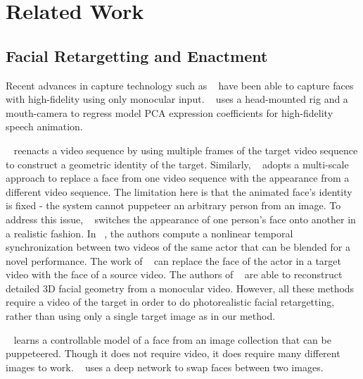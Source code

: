 \section{Related Work}

\subsection{Facial Retargetting and Enactment}
Recent advances in capture technology such as ~\cite{cao2015real,f2f,laine2016facial} have been able to capture faces with high-fidelity using only monocular input. 
~\cite{olszewski2016high} uses a head-mounted rig and a mouth-camera to regress model PCA expression coefficients for high-fidelity speech animation.  

~\cite{f2f} reenacts a video sequence by using multiple frames of the target video sequence to construct a geometric identity of the target. 
Similarly, ~\cite{rewrite} adopts a multi-scale approach to replace a face from one video sequence with the appearance from a different video sequence. 
The limitation here is that the animated face's identity is fixed - the system cannot puppeteer an arbitrary person from an image. To address this issue, ~\cite{replace} switches the appearance of one person's face onto another in a realistic fashion. In ~\cite{malleson2015facedirector}, the authors compute a nonlinear temporal synchronization between two videos of the same actor that can be blended for a novel performance. The work of ~\cite{garrido2014automatic} can replace the face of the actor in a target video with the face of a source video. The authors of ~\cite{garrido2013reconstructing} are able to reconstruct detailed 3D facial geometry from a monocular video.  
However, all these methods require a video of the target in order to do photorealistic facial retargetting, rather than using only a single target image as in our method.

~\cite{spacey} learns a controllable model of a face from an image collection that can be puppeteered.  Though it does not require video, it does require many different images to work.  ~\cite{face-swap} uses a deep network to swap faces between two images.

